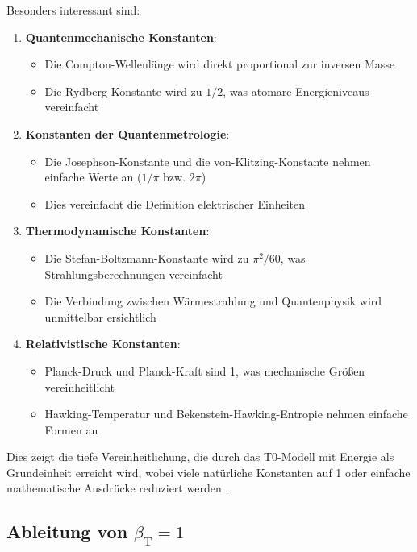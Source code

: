 \documentclass[12pt,a4paper]{article}
\newcommand{\betaT}{\beta_{\text{T}}}
\begin{document}
	Besonders interessant sind:
	
	\begin{enumerate}
		\item \textbf{Quantenmechanische Konstanten}:
		\begin{itemize}
			\item Die Compton-Wellenlänge wird direkt proportional zur inversen Masse
			\item Die Rydberg-Konstante wird zu $1/2$, was atomare Energieniveaus vereinfacht
		\end{itemize}
		
		\item \textbf{Konstanten der Quantenmetrologie}:
		\begin{itemize}
			\item Die Josephson-Konstante und die von-Klitzing-Konstante nehmen einfache Werte an ($1/\pi$ bzw. $2\pi$)
			\item Dies vereinfacht die Definition elektrischer Einheiten
		\end{itemize}
		
		\item \textbf{Thermodynamische Konstanten}:
		\begin{itemize}
			\item Die Stefan-Boltzmann-Konstante wird zu $\pi^2/60$, was Strahlungsberechnungen vereinfacht
			\item Die Verbindung zwischen Wärmestrahlung und Quantenphysik wird unmittelbar ersichtlich
		\end{itemize}
		
		\item \textbf{Relativistische Konstanten}:
		\begin{itemize}
			\item Planck-Druck und Planck-Kraft sind 1, was mechanische Größen vereinheitlicht
			\item Hawking-Temperatur und Bekenstein-Hawking-Entropie nehmen einfache Formen an
		\end{itemize}
	\end{enumerate}
	
	Dies zeigt die tiefe Vereinheitlichung, die durch das T0-Modell mit Energie als Grundeinheit erreicht wird, wobei viele natürliche Konstanten auf 1 oder einfache mathematische Ausdrücke reduziert werden \cite{pascher_params_2025}.
	
	\subsection{Ableitung von $\betaT = 1$}
	
\end{document}
